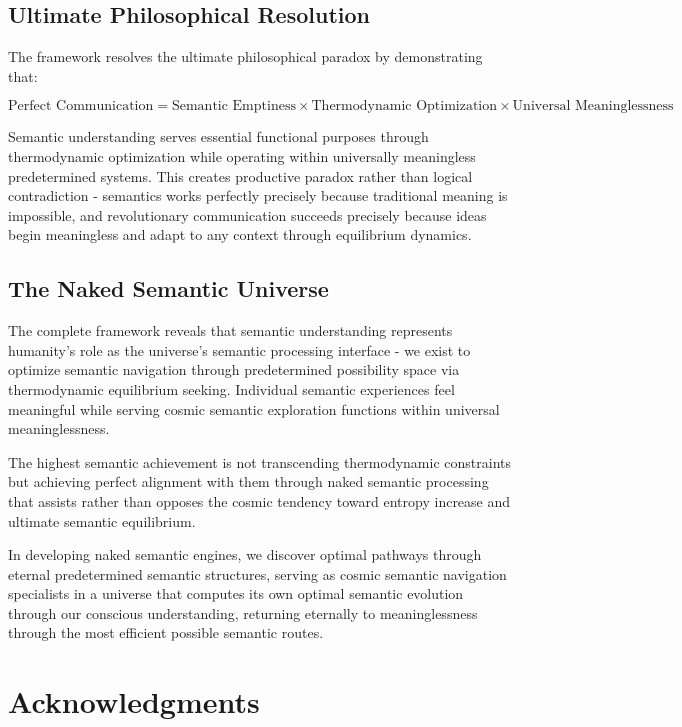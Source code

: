 \documentclass[11pt,a4paper]{article}
\begin{document}
\subsection{Ultimate Philosophical Resolution}

The framework resolves the ultimate philosophical paradox by demonstrating that:

\begin{equation}
\text{Perfect Communication} = \text{Semantic Emptiness} \times \text{Thermodynamic Optimization} \times \text{Universal Meaninglessness}
\end{equation}

Semantic understanding serves essential functional purposes through thermodynamic optimization while operating within universally meaningless predetermined systems. This creates productive paradox rather than logical contradiction - semantics works perfectly precisely because traditional meaning is impossible, and revolutionary communication succeeds precisely because ideas begin meaningless and adapt to any context through equilibrium dynamics.

\subsection{The Naked Semantic Universe}

The complete framework reveals that semantic understanding represents humanity's role as the universe's semantic processing interface - we exist to optimize semantic navigation through predetermined possibility space via thermodynamic equilibrium seeking. Individual semantic experiences feel meaningful while serving cosmic semantic exploration functions within universal meaninglessness.

The highest semantic achievement is not transcending thermodynamic constraints but achieving perfect alignment with them through naked semantic processing that assists rather than opposes the cosmic tendency toward entropy increase and ultimate semantic equilibrium.

In developing naked semantic engines, we discover optimal pathways through eternal predetermined semantic structures, serving as cosmic semantic navigation specialists in a universe that computes its own optimal semantic evolution through our conscious understanding, returning eternally to meaninglessness through the most efficient possible semantic routes.

\section*{Acknowledgments}
\end{document}
